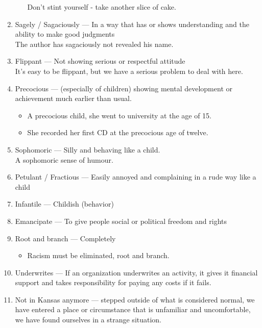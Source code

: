 \documentclass[oneside]{book}
\begin{document}
\begin{enumerate}
\begin{enumerate}
            \footnotesize Don't stint yourself - take another slice of cake. \normalsize
        \end{enumerate}
        \item Sagely / Sagaciously --- In a way that has or shows understanding and the ability to make good judgments\\
        \footnotesize The author has sagaciously not revealed his name. \normalsize
        \item Flippant --- Not showing serious or respectful attitude\\
        \footnotesize It's easy to be flippant, but we have a serious problem to deal with here. \normalsize
        \item Precocious --- (especially of children) showing mental development or achievement much earlier than usual.
        \begin{itemize} \footnotesize
            \item A precocious child, she went to university at the age of 15.
            \item She recorded her first CD at the precocious age of twelve.
        \end{itemize} \normalsize
        \item Sophomoric --- Silly and behaving like a child.\\
        \footnotesize A sophomoric sense of humour. \normalsize
        \item Petulant / Fractious --- Easily annoyed and complaining in a rude way like a child
        \item Infantile --- Childish (behavior)
        \item Emancipate --- To give people social or political freedom and rights
        \item Root and branch --- Completely
        \begin{itemize} \footnotesize
            \item Racism must be eliminated, root and branch.
        \end{itemize} \normalsize
        \item Underwrites --- If an organization underwrites an activity, it gives it financial support and takes responsibility for paying any costs if it fails.
        \item Not in Kansas anymore --- stepped outside of what is considered normal, we have entered a place or circumstance that is unfamiliar and uncomfortable, we have found ourselves in a strange situation.

\end{enumerate}
\end{document}
